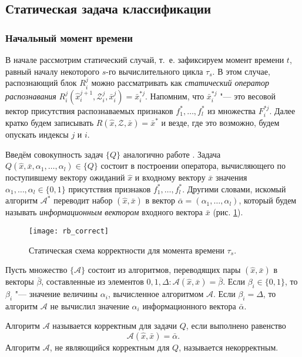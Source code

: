 \subsection{Статическая задача классификации}

\subsubsection{Начальный момент времени}
В начале рассмотрим статический случай, т.~е. зафиксируем момент времени $t$, равный началу некоторого $s$-го вычислительного цикла $\tau_s$. В этом случае, распознающий блок $R_i^j$ можно рассматривать как \textit{статический оператор распознавания} $R_i^j(\hat{x}_i^{j+1},\mathcal{Z}_i^j,\bar{x}_i^j)=\bar{x}_i^{*j}$. Напомним, что $\bar{x}_i^{*j}$ "--- это весовой вектор присутствия распознаваемых признаков $f_1^*,\dots,f_l^*$ из множества $F_i^{*j}$. Далее кратко будем записывать $R(\hat{x},\mathcal{Z},\bar{x})=\bar{x}^*$ и везде, где это возможно, будем опускать индексы $j$ и $i$.
	
Введём совокупность задач $\{Q\}$ аналогично работе \cite{Zhuravlev1977,ZhuravlevE1977}. Задача $Q(\hat{x},\bar{x},\alpha_1,\dots,\alpha_l)\in\{Q\}$ состоит в построении оператора, вычисляющего по поступившему вектору ожиданий $\hat{x}$ и входному вектору $\bar{x}$ значения $\alpha_1,\dots,\alpha_l\in\{0,1\}$ присутствия признаков $f_1^*,\dots,f_l^*$. Другими словами, искомый алгоритм $\mathcal{A}^*$ переводит набор $(\hat{x},\bar{x})$ в вектор $\bar{\alpha}=(\alpha_1,\dots,\alpha_l)$, который будем называть \textit{информационным вектором} входного вектора $\bar{x}$ (рис. \ref{fig:rb_correct_stat0}).
	
\begin{figure}[h]
	\centering
	\texttt{[image: rb\_correct]}
	\caption{Статическая схема корректности для момента времени $\tau_s$.}
	\label{fig:rb_correct_stat0}
\end{figure}

Пусть множество $\{\mathcal{A}\}$ состоит из алгоритмов, переводящих пары $(\hat{x},\bar{x})$ в векторы $\bar{\beta}$, составленные из элементов $0,1,\Delta:\mathcal{A}(\hat{x},\bar{x})=\bar{\beta}$. Если $\beta_i\in\{0,1\}$, то $\beta_i$ "--- значение величины $\alpha_i$, вычисленное алгоритмом $\mathcal{A}$. Если $\beta_i=\Delta$, то алгоритм $\mathcal{A}$ не вычислил значение $\alpha_i$ информационного вектора $\bar\alpha$.
	
\begin{Def}
	Алгоритм $\mathcal{A}$ называется корректным для задачи $Q$, если выполнено равенство
	\[
	\mathcal{A}(\hat{x},\bar{x})=\bar{\alpha}.
	\]
	Алгоритм $\mathcal{A}$, не являющийся корректным для $Q$, называется некорректным.
\end{Def}

